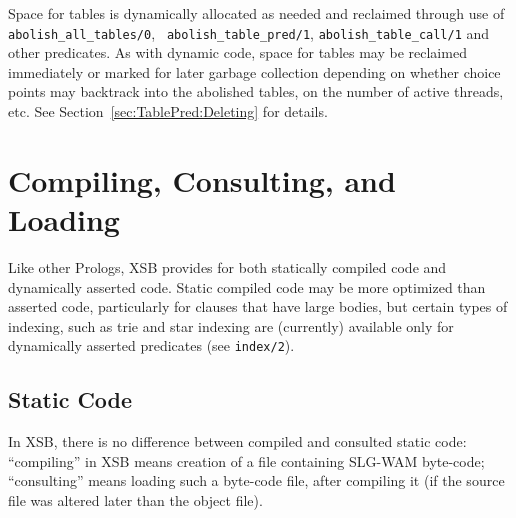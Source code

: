 Space for tables is dynamically allocated as needed and reclaimed
through use of {\tt abolish\_all\_tables/0}, {\tt
  abolish\_table\_pred/1}, {\tt abolish\_table\_call/1} and other
predicates.  As with dynamic code, space for tables may be reclaimed
immediately or marked for later garbage collection depending on
whether choice points may backtrack into the abolished tables, on the
number of active threads, etc.  See
Section~\ref{sec:TablePred:Deleting} for details.

\section{Compiling, Consulting, and Loading} \label{Consulting}
Like other Prologs, XSB provides for both statically compiled code and
dynamically asserted code.  Static compiled code may be more optimized
than asserted code, particularly for clauses that have large bodies,
but certain types of indexing, such as trie and star indexing are
(currently) available only for dynamically asserted predicates (see
{\tt index/2}).

\subsection{Static Code}
%
In XSB, there is no difference between compiled and consulted static
code: ``compiling'' in XSB means creation of a file containing SLG-WAM
byte-code; ``consulting'' means loading such a byte-code file, after
compiling it (if the source file was altered later than the object
file).

